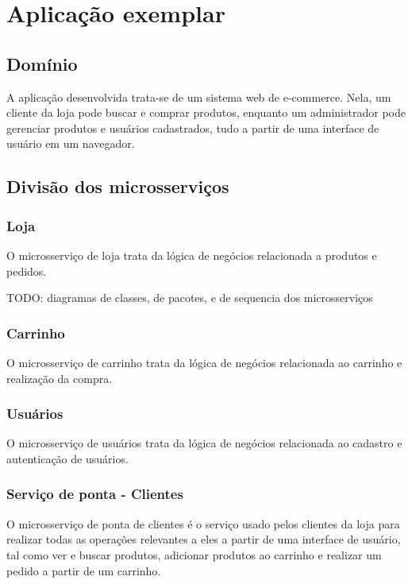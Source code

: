 \chapter{Aplicação exemplar}\label{chapter-aplicacao}


\section{Domínio}
A aplicação desenvolvida trata-se de um sistema web de e-commerce. Nela, um cliente da loja pode buscar e comprar produtos, enquanto um administrador pode gerenciar produtos e usuários cadastrados, tudo a partir de uma interface de usuário em um navegador.

\section{Divisão dos microsserviços}

\subsection{Loja}
O microsserviço de loja trata da lógica de negócios relacionada a produtos e pedidos.

TODO: diagramas de classes, de pacotes, e de sequencia dos microsserviços

\subsection{Carrinho}
O microsserviço de carrinho trata da lógica de negócios relacionada ao carrinho e realização da compra.

\subsection{Usuários}
O microsserviço de usuários trata da lógica de negócios relacionada ao cadastro e autenticação de usuários.

\subsection{Serviço de ponta - Clientes}
O microsserviço de ponta de clientes é o serviço usado pelos clientes da loja para realizar todas as operações relevantes a eles a partir de uma interface de usuário, tal como ver e buscar produtos, adicionar produtos ao carrinho e realizar um pedido a partir de um carrinho.

